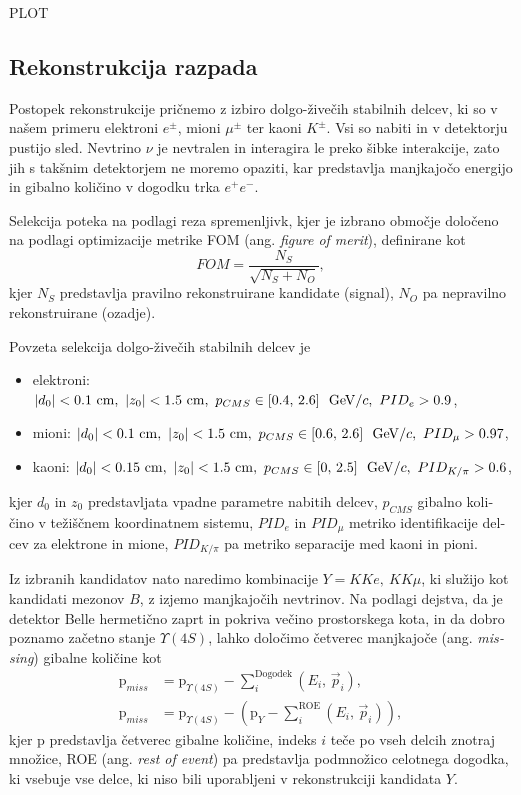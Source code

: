 \begin{otherlanguage}{slovene}
PLOT

\subsection{Rekonstrukcija razpada}

Postopek rekonstrukcije pričnemo z izbiro dolgo-živečih stabilnih delcev, ki so v našem primeru elektroni $e^\pm$, mioni $\mu^\pm$ ter kaoni $K^\pm$. Vsi so nabiti in v detektorju pustijo sled. Nevtrino $\nu$ je nevtralen in interagira le preko šibke interakcije, zato jih s takšnim detektorjem ne moremo opaziti, kar predstavlja manjkajočo energijo in gibalno količino v dogodku trka $e^+e^-$.

Selekcija poteka na podlagi reza spremenljivk, kjer je izbrano območje določeno na podlagi optimizacije metrike FOM (ang. \textit{figure of merit}), definirane kot 
\begin{equation}
FOM = \frac{N_S}{\sqrt{N_S + N_O}},
\end{equation}
kjer $N_S$ predstavlja pravilno rekonstruirane kandidate (signal), $N_O$ pa nepravilno rekonstruirane (ozadje).

Povzeta selekcija dolgo-živečih stabilnih delcev je
\begin{itemize}
\item elektroni: $\vert d_0 \vert < 0.1\mathrm{~cm},~\vert z_0 \vert < 1.5\mathrm{~cm},~p_{CMS} \in [0.4,\,2.6]~\mathrm{~GeV}/c,~PID_e > 0.9$,
\item mioni: $\vert d_0 \vert < 0.1\mathrm{~cm},~\vert z_0 \vert < 1.5\mathrm{~cm},~p_{CMS} \in [0.6,\,2.6]~\mathrm{~GeV}/c,~PID_\mu > 0.97$,
\item kaoni: $\vert d_0 \vert < 0.15\mathrm{~cm},~\vert z_0 \vert < 1.5\mathrm{~cm},~p_{CMS} \in [0,\,2.5]~\mathrm{~GeV}/c,~PID_{K/\pi} > 0.6$,
\end{itemize}
kjer $d_0$ in $z_0$ predstavljata vpadne parametre nabitih delcev, $p_{CMS}$ gibalno količino v težiščnem koordinatnem sistemu, $PID_e$ in $PID_\mu$ metriko identifikacije delcev za elektrone in mione, $PID_{K/\pi}$ pa metriko separacije med kaoni in pioni.

Iz izbranih kandidatov nato naredimo kombinacije $Y = KKe,~KK\mu$, ki služijo kot kandidati mezonov $B$, z izjemo manjkajočih nevtrinov. Na podlagi dejstva, da je detektor Belle hermetično zaprt in pokriva večino prostorskega kota, in da dobro poznamo začetno stanje $\Upsilon(4S)$, lahko določimo četverec manjkajoče (ang. \textit{missing}) gibalne količine kot
\begin{align}
\mathrm{p}_{miss} &= \mathrm{p}_{\Upsilon(4S)} - \sum_i^{\mathrm{Dogodek}}\left(E_i,\,\vec{p}_i \right),\\
\label{eq:ROEloop_si}
\mathrm{p}_{miss} &= \mathrm{p}_{\Upsilon(4S)} - \left(\mathrm{p}_{Y} -\sum_i^{\mathrm{ROE}}\left(E_i,\,\vec{p}_i \right)\right),
\end{align}
kjer $\mathrm{p}$ predstavlja četverec gibalne količine, indeks $i$ teče po vseh delcih znotraj množice, ROE (ang. \textit{rest of event}) pa predstavlja podmnožico celotnega dogodka, ki vsebuje vse delce, ki niso bili uporabljeni v rekonstrukciji kandidata $Y$.


\end{otherlanguage}
